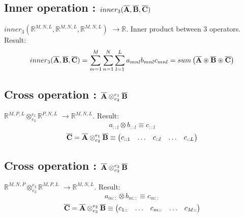 \documentclass[11pt]{article}
\newcommand{\TRIX}[1]{\mathbf{\overline{\uppercase{#1}}}}
\newcommand{\mulebe}{\circledast}
\newcommand{\mulcross}{\otimes}
\newcommand{\dimsep}{,}
\newcommand{\mulcrossyx}{\mulcross_{e_2}^{e_1}}
\newcommand{\mulcrosszy}{\mulcross_{e_3}^{e_2}}
\newcommand{\funcmuliiinner}{inner_3 }
\begin{document}
 \subsection{Inner operation : $\funcmuliiinner( \TRIX{A},\TRIX{B}, \TRIX{C})$}

 $\funcmuliiinner(\mathbb{R}^{M\dimsep N \dimsep L}, \mathbb{R}^{M\dimsep N \dimsep L}, \mathbb{R}^{M\dimsep N \dimsep L})$ 
 $\rightarrow \mathbb{R}$.
 Inner product between 3 operators. Result: 
  \begin{equation}
\funcmuliiinner( \TRIX{A},\TRIX{B}, \TRIX{C}) = 
\sum \limits_{m=1}^{M}\sum \limits_{n=1}^{N}\sum \limits_{l=1}^{L} {a_{mnl} b_{mnl} c_{mnl}} = 
sum\left(\TRIX{A}\mulebe  \TRIX{B}\mulebe  \TRIX{C}\right)
  \end{equation}
  
\subsection{Cross operation : $\TRIX{A} \mulcrossyx \TRIX{B}$}
$\mathbb{R}^{M\dimsep P\dimsep L}\mulcrossyx \mathbb{R}^{P\dimsep N\dimsep L}$ $\rightarrow \mathbb{R}^{M\dimsep N\dimsep L}$.
Result: 
  \begin{equation}
  a_{::l}\mulcross b_{::l} \equiv c_{::l}
  \end{equation}
 \begin{equation}
\TRIX{C}=\TRIX{A} \mulcrossyx \TRIX{B} \equiv \left(
 \begin{matrix}
 c_{::1}&\hdots&c_{::l}&\hdots&c_{::L}\\
 \end{matrix}
 \right)
\end{equation}

\subsection{Cross operation : $\TRIX{A} \mulcrosszy \TRIX{B}$}
$\mathbb{R}^{M\dimsep N\dimsep P}\mulcrosszy \mathbb{R}^{M \dimsep P\dimsep L}$ $\rightarrow \mathbb{R}^{M\dimsep N\dimsep L}$.
Result: 
  \begin{equation}
  a_{m::}\mulcross b_{m::} \equiv c_{m::}
  \end{equation}
 \begin{equation}
\TRIX{C}=\TRIX{A} \mulcrosszy \TRIX{B} \equiv \left(
 \begin{matrix}
 c_{1::}&\hdots&c_{m::}&\hdots&c_{M::}\\
 \end{matrix}
 \right)
\end{equation}
\end{document}
